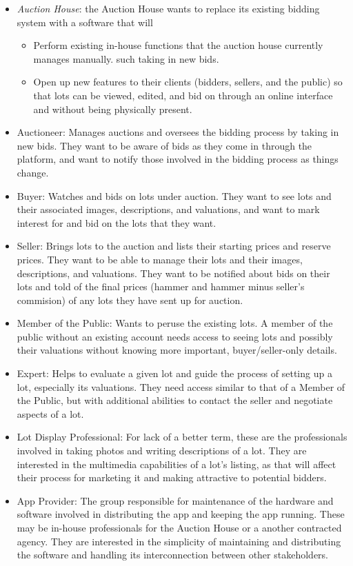 \documentclass[titlepage]{article}
\begin{document}
\begin{itemize}
\item {\it Auction House}: the Auction House wants to replace its existing bidding system with a software that will
    \begin{itemize}
    \item Perform existing in-house functions that the auction house currently manages manually. such taking in new bids.
    \item Open up new features to their clients (bidders, sellers, and the public) so that lots can be viewed, edited, and bid on through an online interface and without being physically present.
    \end{itemize}
\item Auctioneer: Manages auctions and oversees the bidding process by taking in new bids. They want to be aware of bids as they come in through the platform, and want to notify those involved in the bidding process as things change.
\item Buyer: Watches and bids on lots under auction. They want to see lots and their associated images, descriptions, and valuations, and want to mark interest for and bid on the lots that they want.
\item Seller: Brings lots to the auction and lists their starting prices and reserve prices. They want to be able to manage their lots and their images, descriptions, and valuations. They want to be notified about bids on their lots and told of the final prices (hammer and hammer minus seller's commision) of any lots they have sent up for auction.
\item Member of the Public: Wants to peruse the existing lots. A member of the public without an existing account needs access to seeing lots and possibly their valuations without knowing more important, buyer/seller-only details.
\item Expert: Helps to evaluate a given lot and guide the process of setting up a lot, especially its valuations. They need access similar to that of a Member of the Public, but with additional abilities to contact the seller and negotiate aspects of a lot.
\item Lot Display Professional: For lack of a better term, these are the professionals involved in taking photos and writing descriptions of a lot. They are interested in the multimedia capabilities of a lot's listing, as that will affect their process for marketing it and making attractive to potential bidders.
\item App Provider: The group responsible for maintenance of the hardware and software involved in distributing the app and keeping the app running. These may be in-house professionals for the Auction House or a another contracted agency. They are interested in the simplicity of maintaining and distributing the software and handling its interconnection between other stakeholders.
\end{itemize}
\end{document}
